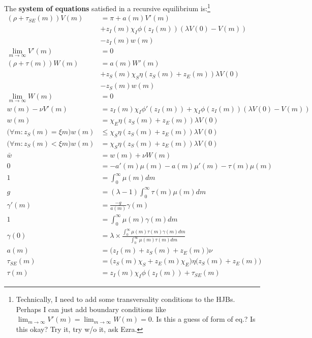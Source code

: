 \documentclass[12pt,english]{article}
\theoremstyle{remark}
\begin{document}
The\textbf{ system of equations} satisfied in a recursive equilibrium is:\footnote{Technically, I need to add some transversality conditions to the HJBs. Perhaps I can just add boundary conditions like $\lim_{m\to \infty} V'(m) = \lim_{m \to \infty} W(m) = 0$. Is this a guess of form of eq.? Is this okay? Try it, try w/o it, ask Ezra.}
\begin{align}
(\rho + \tau_{SE}(m))V(m) &=  \pi + a(m) V'(m) \label{HJB_V}\\
						  &+ z_I(m)\chi_I \phi(z_I(m)) (\lambda V(0) - V(m)) \nonumber \\
						  &- z_I(m)w(m) \nonumber \\ 
\lim_{m \to \infty} V'(m) &= \label{HJB_V_Boundary} 0 \\
(\rho + \tau(m)) W(m) &= a(m) W'(m) \label{HJB_W}\\
						&+ z_S(m)\chi_S\eta(z_S(m) + z_E(m))\lambda V(0) \nonumber \\
						&- z_S(m)w(m)  \nonumber	\\	
\lim_{m \to \infty} W(m) &= 0 \label{HJB_W_Boundary} \\ 										  
w(m) - \nu V'(m) &= z_I(m)\chi_I\phi'(z_I(m)) + \chi_I \phi(z_I(m)) (\lambda V(0) - V(m)) \label{HJB_V_FOC}\\
w(m) &= \chi_E\eta(z_S(m) + z_E(m)) \lambda V(0) \label{E_FreeEntry}\\ 
\Big(\forall m: z_S(m) = \xi m \Big) w(m) &\le \chi_S \eta(z_S(m) + z_E(m)) \lambda V(0) \label{HJB_W_Optimality1}\\
\Big(\forall m: z_S(m) < \xi m \Big) w(m) &= \chi_S \eta(z_S(m) + z_E(m)) \lambda V(0) \label{HJB_W_Optimality2}\\
\bar{w} &= w(m) + \nu W(m) \label{Indifference}\\
0 &= - a'(m)\mu(m) - a(m)\mu'(m) - \tau(m)\mu(m) \label{KF}\\
1 &= \int_{0}^{\infty} \mu(m) dm \label{KF_integral}\\
g &= (\lambda - 1) \int_{0}^{\infty} \tau(m) \mu(m) dm \label{growth_aggregation} \\
\gamma'(m) &= \frac{-g }{a(m)} \gamma(m) \label{gamma_firstorder}\\
1 &= \int_{0}^{\infty} \mu(m) \gamma(m) dm \label{gamma_integral}\\ 
\gamma(0) &= \lambda \times \frac{\int_{0}^{\infty} \mu(m) \tau(m) \gamma(m)  dm}{\int_{0}^{\infty} \mu(m) \tau(m) dm} \label{gamma_consistency}\\
a(m) &= \big( z_I(m) + z_S(m) + z_E(m) \big) \nu \label{a_def}\\
\tau_{SE}(m) &= \big(z_S(m) \chi_S + z_E(m) \chi_E \big) \eta \big(z_S(m) + z_E(m)\big) \label{tau_SE_def}\\
\tau(m) &= z_I(m) \chi_I \phi(z_I(m)) + \tau_{SE}(m)  \label{tau_def}
\end{align}
\end{document}
